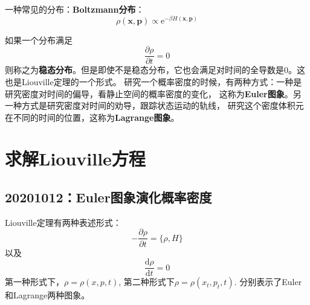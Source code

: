     一种常见的分布：\textbf{Boltzmann分布}：
    \begin{equation*}
        \rho(\bm{x},\bm{p}) \propto \mathrm{e}^{-\beta H(\bm{x},\bm{p})}
    \end{equation*}

    如果一个分布满足
    \begin{equation*}
        \frac {\partial \rho}{\partial t} = 0
    \end{equation*}
    则称之为\textbf{稳态分布}。但是即使不是稳态分布，它也会满足对时间的全导数是0。这也是Liouville定理的一个形式。
    研究一个概率密度的时候，有两种方式：一种是研究密度对时间的偏导，看静止空间的概率密度的变化，
    这称为\textbf{Euler图象}。另一种方式是研究密度对时间的劝导，跟踪状态运动的轨线，
    研究这个密度体积元在不同的时间的位置，这称为\textbf{Lagrange图象}。
    \section{求解Liouville方程}
    \subsection{20201012：Euler图象演化概率密度}
    Liouville定理有两种表述形式：
    \begin{equation*}
        -\frac {\partial \rho}{\partial t} = \{ \rho,H \}
    \end{equation*}
    以及 
    \begin{equation*}
        \frac {\mathrm{d}\rho}{\mathrm{d}t} = 0
    \end{equation*}
    第一种形式下，$\rho = \rho(x, p ,t)$, 第二种形式下$\rho = \rho(x_t,p_t,t)$. 分别表示了Euler和Lagrange两种图象。

